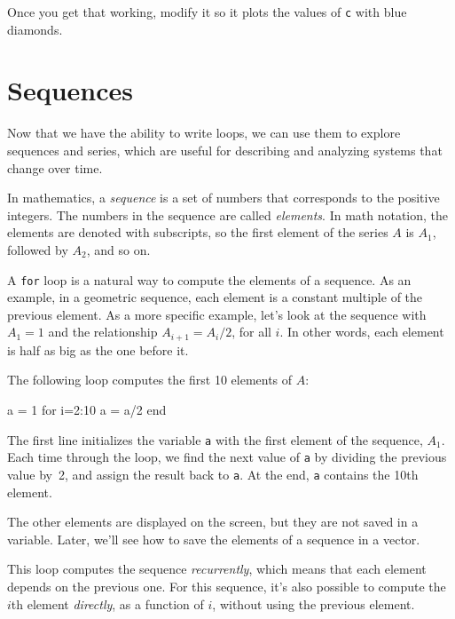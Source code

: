 Once you get that working, modify it so it plots the values of \lstinline{c} with blue diamonds.


\section{Sequences}

Now that we have the ability to write loops, we can use them to explore sequences and series, which are useful for describing and analyzing systems that change over time.

In mathematics, a \emph{sequence} is a set of numbers that corresponds to the positive integers.  The numbers in the sequence are called \emph{elements}.  In math notation, the elements are denoted with subscripts, so the first element of the series $A$ is
$A_1$, followed by $A_2$, and so on.


A \lstinline{for} loop is a natural way to compute the elements of a sequence.
As an example, in a geometric sequence, each element is a constant
multiple of the previous element.  As a more specific example, let's
look at the sequence with $A_1 = 1$ and the relationship $A_{i+1} = A_i/2$,
for all $i$.  In other words, each element is half as big as the one before it.

The following loop computes the first 10 elements of $A$:

\begin{code}
a = 1
for i=2:10
    a = a/2
end
\end{code}

The first line initializes the variable \lstinline{a} with the first element of the sequence, $A_1$.
Each time through the loop, we find the next value of \lstinline{a}
by dividing the previous value by~2, and assign the result back to \lstinline{a}.
At the end, \lstinline{a} contains the 10th element.

The other elements are displayed on the screen, but they are not saved in a variable.  
Later, we'll see how to save the elements of a sequence in a vector.


This loop computes the sequence \emph{recurrently}, which means
that each element depends on the previous one.
For this sequence, it's also possible to compute the $i$th element
\emph{directly}, as a function of $i$, without using the previous element.

